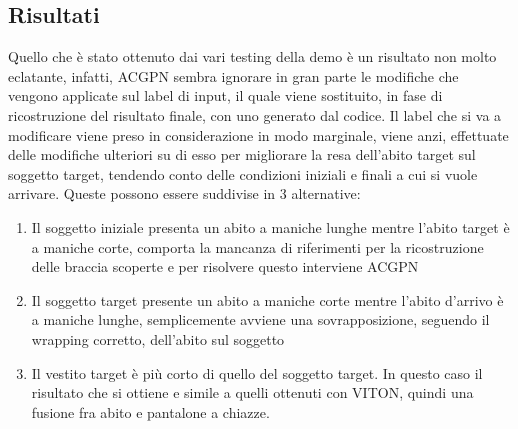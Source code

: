 \documentclass[final, 11pt]{article}
\begin{document}
	\subsection{Risultati}
	Quello che è stato ottenuto dai vari testing della demo è un risultato non molto eclatante, infatti, ACGPN sembra ignorare in gran parte le modifiche che vengono applicate sul label di input, il quale viene sostituito, in fase di ricostruzione del risultato finale, con uno generato dal codice.
	Il label che si va a modificare viene preso in considerazione in modo marginale, viene anzi, effettuate delle modifiche ulteriori su di esso per migliorare la resa dell’abito target sul soggetto target, tendendo conto delle condizioni iniziali e finali a cui si vuole arrivare. 
	Queste possono essere suddivise in 3 alternative:
	\begin{enumerate}
		\item Il soggetto iniziale presenta un abito a maniche lunghe mentre l’abito target è a maniche corte, comporta la mancanza di riferimenti per la ricostruzione delle braccia scoperte e per risolvere questo interviene ACGPN
		\item Il soggetto target presente un abito a maniche corte mentre l’abito d’arrivo è a maniche lunghe, semplicemente avviene una sovrapposizione, seguendo il wrapping corretto, dell’abito sul soggetto
		\item Il vestito target è più corto di quello del soggetto target. In questo caso il risultato che si ottiene e simile a quelli ottenuti con VITON, quindi una fusione fra abito e pantalone a chiazze.
	\end{enumerate}
	
	
\end{document}
